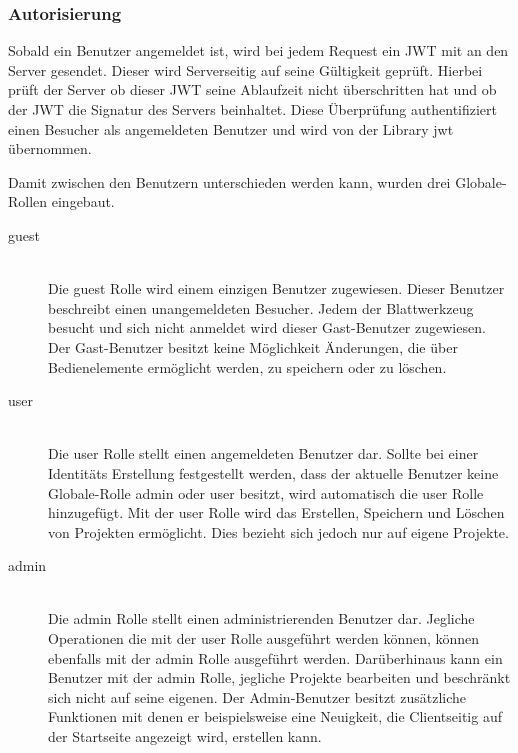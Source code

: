 \documentclass[paper=a4,fontsize=12pt,parskip=half]{scrartcl}
\begin{document}
	\subsubsection{Autorisierung}
	Sobald ein Benutzer angemeldet ist, wird bei jedem Request ein \gls{JWT} mit an den Server gesendet. Dieser wird Serverseitig auf seine Gültigkeit geprüft. Hierbei prüft der Server ob dieser \gls{JWT} seine Ablaufzeit nicht überschritten hat und ob der \gls{JWT} die Signatur des Servers beinhaltet. Diese Überprüfung authentifiziert einen Besucher als angemeldeten Benutzer und wird von der Library jwt übernommen. 
	
	Damit zwischen den Benutzern unterschieden werden kann, wurden drei Globale-Rollen eingebaut.

	\begin{description}
		\item[guest]\hfill\\
		Die guest Rolle wird einem einzigen Benutzer zugewiesen. Dieser Benutzer beschreibt einen unangemeldeten Besucher. Jedem der Blattwerkzeug besucht und sich nicht anmeldet wird dieser Gast-Benutzer zugewiesen. Der Gast-Benutzer besitzt keine Möglichkeit Änderungen, die über Bedienelemente ermöglicht werden, zu speichern oder zu löschen.
		\item[user]\hfill\\
		Die user Rolle stellt einen angemeldeten Benutzer dar. Sollte bei einer Identitäts Erstellung festgestellt werden, dass der aktuelle Benutzer keine Globale-Rolle admin oder user besitzt, wird automatisch die user Rolle hinzugefügt. Mit der user Rolle wird das Erstellen, Speichern und Löschen von Projekten ermöglicht. Dies bezieht sich jedoch nur auf eigene Projekte. 
		\item[admin]\hfill\\
		Die admin Rolle stellt einen administrierenden Benutzer dar. Jegliche Operationen die mit der user Rolle ausgeführt werden können, können ebenfalls mit der admin Rolle ausgeführt werden. Darüberhinaus kann ein Benutzer mit der admin Rolle, jegliche Projekte bearbeiten und beschränkt sich nicht auf seine eigenen. Der Admin-Benutzer besitzt zusätzliche Funktionen mit denen er beispielsweise eine Neuigkeit, die Clientseitig auf der Startseite angezeigt wird, erstellen kann.
	\end{description}
\end{document}
